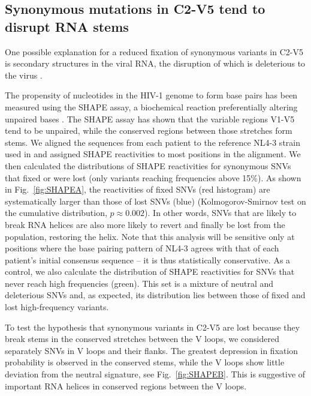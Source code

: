 \documentclass[11pt]{article}
\newcommand{\FIG}[1]{Fig.~\ref{fig:#1}}
\newcommand{\shankaregion}{C2-V5}
\begin{document}
\subsection*{Synonymous mutations in \shankaregion{} tend to disrupt RNA stems}
One possible explanation for a reduced fixation of synonymous variants in
\shankaregion{} is secondary structures in the viral RNA, the disruption of which
is deleterious to the virus \citep{forsdyke_reciprocal_1995,
snoeck_mapping_2011, sanjuan_interplay_2011}.

The propensity of nucleotides in the HIV-1 genome to form base pairs has been
measured using the SHAPE assay, a biochemical reaction preferentially altering
unpaired bases 
\citep{watts_architecture_2009}. The SHAPE assay has shown that the variable
regions V1-V5 tend to be unpaired, while the conserved regions between those
stretches form stems. We aligned the sequences from each patient to
the reference NL4-3 strain used in \citet{watts_architecture_2009} and assigned
SHAPE reactivities to most positions in the alignment. We then calculated the
distributions of SHAPE reactivities for synonymous SNVs that fixed or were
lost (only variants reaching frequencies above 15\%). As shown in
\FIG{SHAPEA}, the reactivities of fixed SNVs (red histogram) are systematically
larger than those of lost SNVs (blue) (Kolmogorov-Smirnov test on the cumulative
distribution, $p\approx 0.002$). In other words, SNVs that are likely to
break RNA helices are also more likely to revert and finally be lost from the
population, restoring the helix. Note that this analysis will be sensitive only
at positions where the base pairing pattern of NL4-3 agrees with that of each
patient's initial consensus sequence -- it is thus statistically conservative.
As a control, we also calculate the distribution of SHAPE reactivities for SNVs
that never reach high frequencies (green). This set is a mixture of neutral and
deleterious SNVs and, as expected, its distribution lies between those of
fixed and lost high-frequency variants.

To test the hypothesis that synonymous variants in \shankaregion{} are lost because they
break stems in the conserved stretches between the V loops, we considered
separately SNVs in V loops and their flanks. The greatest
depression in fixation probability is observed in the conserved stems, while the
V loops show little deviation from the neutral signature, see
\FIG{SHAPEB}. This is suggestive of important RNA helices in conserved
regions between the V loops.
\end{document}
